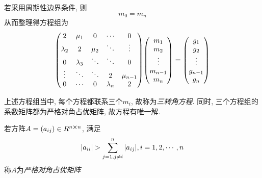 若采用周期性边界条件, 则
\begin{equation*}
    m_0=m_n
\end{equation*}
从而整理得方程组为
\begin{equation*}
    \mqty(
        2&\mu_1&0&\cdots&0\\
        \lambda_2&2&\mu_2&\ddots&\vdots\\
        0&\lambda_3&\ddots&\ddots&0\\
        \vdots&\ddots&\ddots&2&\mu_{n-1}\\
        0&\cdots&0&\lambda_n&2
    )\mqty(m_1\\m_2\\\vdots\\m_{n-1}\\m_n)=\mqty(g_1\\g_2\\\vdots\\g_{n-1}\\g_n)
\end{equation*}

上述方程组当中, 每个方程都联系三个$m_i$, 故称为\emph{三转角方程}. 同时, 三个方程组的系数矩阵都为严格对角占优矩阵, 故方程有唯一解.

\begin{extend}
    \begin{definition}[严格对角占优矩阵]
        若方阵$A=(a_{ij})\in R^{n\cross n}$, 满足
        \begin{equation*}
            \abs{a_{ii}}>\sum_{j=1,j\ne i}^n\abs{a_{ij}}, i=1,2,\cdots,n
        \end{equation*}
        称$A$为\emph{严格对角占优矩阵}
    \end{definition}
\end{extend}

